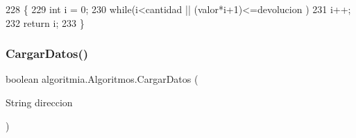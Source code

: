 \begin{DoxyCode}
228     \{
229     \textcolor{keywordtype}{int} i = 0;
230     \textcolor{keywordflow}{while}(i<cantidad || (valor*i+1)<=devolucion )
231         i++;
232     \textcolor{keywordflow}{return} i;
233     \}
\end{DoxyCode}
\mbox{\label{classalgoritmia_1_1_algoritmos_a3b4d1e52cfec7e78cb42208bf63a4f65}} 
\subsubsection{\texorpdfstring{Cargar\+Datos()}{CargarDatos()}}
{\footnotesize\ttfamily boolean algoritmia.\+Algoritmos.\+Cargar\+Datos (\begin{DoxyParamCaption}\item[{String}]{direccion }\end{DoxyParamCaption})\hspace{0.3cm}{\ttfamily [inline]}}


